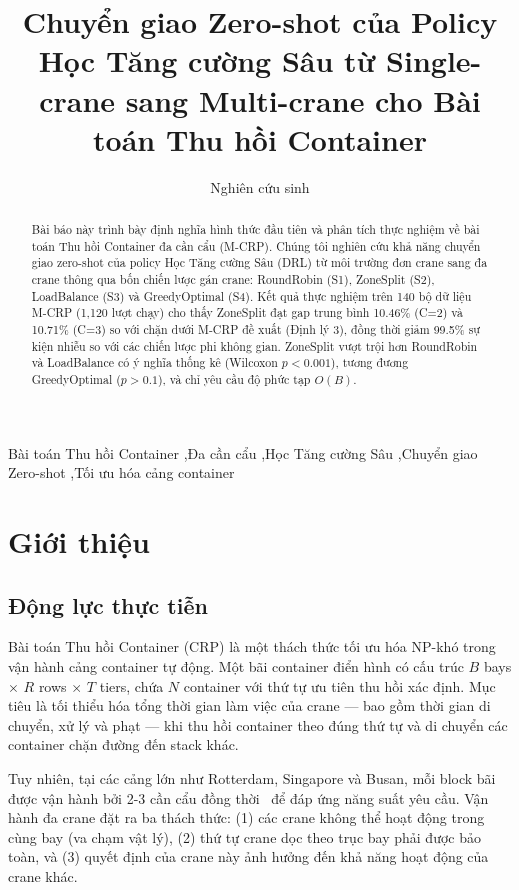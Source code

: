 \documentclass[11pt,a4paper]{elsarticle}
\begin{document}
\begin{frontmatter}
\title{Chuyển giao Zero-shot của Policy Học Tăng cường Sâu từ Single-crane sang Multi-crane cho Bài toán Thu hồi Container}

\author[inst]{Nghiên cứu sinh}
\address[inst]{Trường Đại học, Việt Nam}

\begin{abstract}
Bài báo này trình bày định nghĩa hình thức đầu tiên và phân tích thực nghiệm về bài toán Thu hồi Container đa cần cẩu (M-CRP). Chúng tôi nghiên cứu khả năng chuyển giao zero-shot của policy Học Tăng cường Sâu (DRL) từ môi trường đơn crane sang đa crane thông qua bốn chiến lược gán crane: RoundRobin (S1), ZoneSplit (S2), LoadBalance (S3) và GreedyOptimal (S4). Kết quả thực nghiệm trên 140 bộ dữ liệu M-CRP (1,120 lượt chạy) cho thấy ZoneSplit đạt gap trung bình 10.46\% (C=2) và 10.71\% (C=3) so với chặn dưới M-CRP đề xuất (Định lý 3), đồng thời giảm 99.5\% sự kiện nhiễu so với các chiến lược phi không gian. ZoneSplit vượt trội hơn RoundRobin và LoadBalance có ý nghĩa thống kê (Wilcoxon $p<0.001$), tương đương GreedyOptimal ($p>0.1$), và chỉ yêu cầu độ phức tạp $O(B)$.
\end{abstract}

\begin{keyword}
Bài toán Thu hồi Container \sep Đa cần cẩu \sep Học Tăng cường Sâu \sep Chuyển giao Zero-shot \sep Tối ưu hóa cảng container
\end{keyword}
\end{frontmatter}

\section{Giới thiệu}

\subsection{Động lực thực tiễn}
Bài toán Thu hồi Container (CRP) là một thách thức tối ưu hóa NP-khó trong vận hành cảng container tự động. Một bãi container điển hình có cấu trúc $B$ bays $\times$ $R$ rows $\times$ $T$ tiers, chứa $N$ container với thứ tự ưu tiên thu hồi xác định. Mục tiêu là tối thiểu hóa tổng thời gian làm việc của crane — bao gồm thời gian di chuyển, xử lý và phạt — khi thu hồi container theo đúng thứ tự và di chuyển các container chặn đường đến stack khác.

Tuy nhiên, tại các cảng lớn như Rotterdam, Singapore và Busan, mỗi block bãi được vận hành bởi 2-3 cần cẩu đồng thời~\cite{stahlbock2008} để đáp ứng năng suất yêu cầu. Vận hành đa crane đặt ra ba thách thức: (1) các crane không thể hoạt động trong cùng bay (va chạm vật lý), (2) thứ tự crane dọc theo trục bay phải được bảo toàn, và (3) quyết định của crane này ảnh hưởng đến khả năng hoạt động của crane khác.
\end{document}
